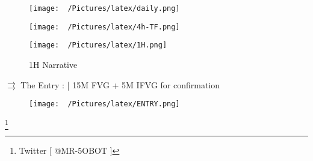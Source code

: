 \documentclass{article}
\begin{document}
\vspace{0.2cm}
\newpage

\centering
\vspace{0.1cm}
\begin{figure}[h!]
\begin{adjustbox}{width=1.1\textwidth,center}
  \texttt{[image: ~/Pictures/latex/daily.png]}
\end{adjustbox}
  \label{fig:image}
\end{figure}


\begin{figure}[h!]
  \begin{adjustbox}{width=1.1\textwidth,center}
  \texttt{[image: ~/Pictures/latex/4h-TF.png]}
\end{adjustbox}
\label{fig:image}
\end{figure}


\newpage
\vspace{4cm}

\begin{figure}[h!]
\caption{1H Narrative}
  \begin{adjustbox}{width=1.1\textwidth,center}
  \texttt{[image: ~/Pictures/latex/1H.png]}
\end{adjustbox}
  \label{fig:image}
\end{figure}


\noindent \( \rightrightarrows \) \hspace{0.1cm}The Entry : |  15M FVG + 5M IFVG for confirmation
\begin{figure}[h!]
  \begin{adjustbox}{width=1.1\textwidth,center}
  \texttt{[image: ~/Pictures/latex/ENTRY.png]}
\end{adjustbox}
\label{fig:image}
\end{figure}

\footnote{Twitter [ @MR-5OBOT ]}

\end{document}
